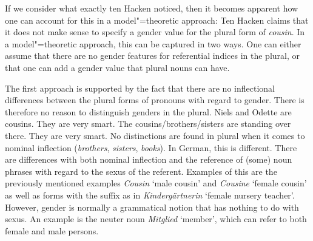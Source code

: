 If we consider what exactly ten Hacken noticed, then it becomes apparent how one can account for this in a model"=theoretic approach:
Ten Hacken claims that it does not make sense to specify a gender value for the plural form of \emph{cousin}. In a model"=theoretic approach, this can be captured
 in two ways. One can either assume that there are no gender features for referential indices in the
plural, or that one can add a gender value that plural nouns can have.

The first approach is supported by the fact that there are no inflectional differences between the
plural forms of pronouns with regard to gender. There is therefore no reason to distinguish genders
in the plural.
\eal
\ex Niels and Odette are cousins. They are very smart.
\ex The cousins/brothers/sisters are standing over there. They are very smart.
\zl
No distinctions are found in plural when it comes to nominal inflection (\emph{brothers},
\emph{sisters}, \emph{books}). In German, this is different. There are differences with both nominal
inflection and the reference of (some) noun phrases 
with regard to the sexus of the referent.
Examples of this are the previously mentioned examples \emph{Cousin} `male cousin' and
\emph{Cousine} `female cousin' as well as forms with the suffix  as in \emph{Kindergärtnerin} `female nursery teacher'.
However, gender is normally a grammatical notion that has nothing to do with sexus.
An example is the neuter noun \emph{Mitglied} `member', which can refer to both female and male persons.

